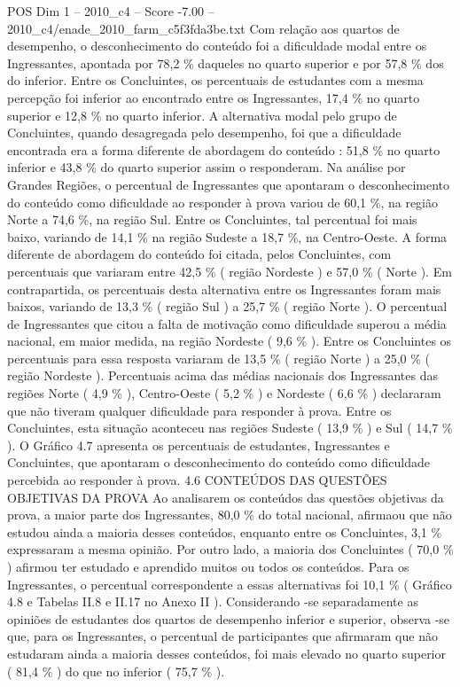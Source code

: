 \begin{textsample}{POS Dim 1 – 2010\_c4 – Score -7.00 – 2010\_c4/enade\_2010\_farm\_c5f3fda3be.txt}
Com relação aos quartos de desempenho, o desconhecimento do conteúdo foi a dificuldade modal entre os Ingressantes, apontada por 78,2 \% daqueles no quarto superior e por 57,8 \% dos do inferior.
Entre os Concluintes, os percentuais de estudantes com a mesma percepção foi inferior ao encontrado entre os Ingressantes, 17,4 \% no quarto superior e 12,8 \% no quarto inferior.
A alternativa modal pelo grupo de Concluintes, quando desagregada pelo desempenho, foi que a dificuldade encontrada era a forma diferente de abordagem do conteúdo : 51,8 \% no quarto inferior e 43,8 \% do quarto superior assim o responderam.
Na análise por Grandes Regiões, o percentual de Ingressantes que apontaram o desconhecimento do conteúdo como dificuldade ao responder à prova variou de 60,1 \%, na região Norte a 74,6 \%, na região Sul.
Entre os Concluintes, tal percentual foi mais baixo, variando de 14,1 \% na região Sudeste a 18,7 \%, na Centro-Oeste.
A forma diferente de abordagem do conteúdo foi citada, pelos Concluintes, com percentuais que variaram entre 42,5 \% ( região Nordeste ) e 57,0 \% ( Norte ).
Em contrapartida, os percentuais desta alternativa entre os Ingressantes foram mais baixos, variando de 13,3 \% ( região Sul ) a 25,7 \% ( região Norte ).
O percentual de Ingressantes que citou a falta de motivação como dificuldade superou a média nacional, em maior medida, na região Nordeste ( 9,6 \% ).
Entre os Concluintes os percentuais para essa resposta variaram de 13,5 \% ( região Norte ) a 25,0 \% ( região Nordeste ).
Percentuais acima das médias nacionais dos Ingressantes das regiões Norte ( 4,9 \% ), Centro-Oeste ( 5,2 \% ) e Nordeste ( 6,6 \% ) declararam que não tiveram qualquer dificuldade para responder à prova.
Entre os Concluintes, esta situação aconteceu nas regiões Sudeste ( 13,9 \% ) e Sul ( 14,7 \% ).
O Gráfico 4.7 apresenta os percentuais de estudantes, Ingressantes e Concluintes, que apontaram o desconhecimento do conteúdo como dificuldade percebida ao responder à prova. 4.6 CONTEÚDOS DAS QUESTÕES OBJETIVAS DA PROVA Ao analisarem os conteúdos das questões objetivas da prova, a maior parte dos Ingressantes, 80,0 \% do total nacional, afirmaou que não estudou ainda a maioria desses conteúdos, enquanto entre os Concluintes, 3,1 \% expressaram a mesma opinião.
Por outro lado, a maioria dos Concluintes ( 70,0 \% ) afirmou ter estudado e aprendido muitos ou todos os conteúdos.
Para os Ingressantes, o percentual correspondente a essas alternativas foi 10,1 \% ( Gráfico 4.8 e Tabelas II.8 e II.17 no Anexo II ).
Considerando -se separadamente as opiniões de estudantes dos quartos de desempenho inferior e superior, observa -se que, para os Ingressantes, o percentual de participantes que afirmaram que não estudaram ainda a maioria desses conteúdos, foi mais elevado no quarto superior ( 81,4 \% ) do que no inferior ( 75,7 \% ).

\end{textsample}
